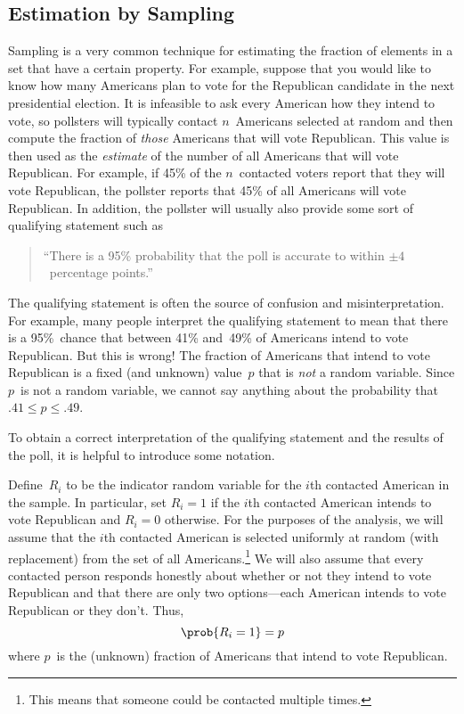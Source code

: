 \begin{editingnotes}
\section{Estimation by Sampling}\label{sec:sampling}

Sampling is a very common technique for estimating the fraction of
elements in a set that have a certain property.  For example, suppose
that you would like to know how many Americans plan to vote for the
Republican candidate in the next presidential election.  It is
infeasible to ask every American how they intend to vote, so pollsters
will typically contact $n$~Americans selected at random and then
compute the fraction of \emph{those} Americans that will vote
Republican.  This value is then used as the \emph{estimate} of the
number of all Americans that will vote Republican.  For example, if
45\% of the $n$~contacted voters report that they will vote
Republican, the pollster reports that 45\% of all Americans will vote
Republican.  In addition, the pollster will usually also provide some
sort of qualifying statement such as
\begin{quote}
``There is a 95\% probability that the poll is accurate to within $\pm
  4$~percentage points.''
\end{quote}

The qualifying statement is often the source of confusion and
misinterpretation.  For example, many people interpret the qualifying
statement to mean that there is a 95\%~chance that between 41\%
and~49\% of Americans intend to vote Republican.  But this is wrong!
The fraction of Americans that intend to vote Republican is a fixed
(and unknown) value~$p$ that is \emph{not} a random variable.  Since
$p$~is not a random variable, we cannot say anything about the
probability that $.41 \le p \le .49$.

To obtain a correct interpretation of the qualifying statement and the
results of the poll, it is helpful to introduce some notation.

Define~$R_i$ to be the indicator random variable for the $i$th
contacted American in the sample.  In particular, set $R_i = 1$ if the
$i$th contacted American intends to vote Republican and $R_i = 0$
otherwise.  For the purposes of the analysis, we will assume that the
$i$th contacted American is selected uniformly at random (with
replacement) from the set of all Americans.\footnote{This means that
someone could be contacted multiple times.}  We will also assume
that every contacted person responds honestly about whether or not
they intend to vote Republican and that there are only two
options---each American intends to vote Republican or they don't.
Thus,
\begin{equation}
    \prob{R_i = 1} = p
\end{equation}
where $p$~is the (unknown) fraction of Americans that intend to vote
Republican.


\end{editingnotes}
